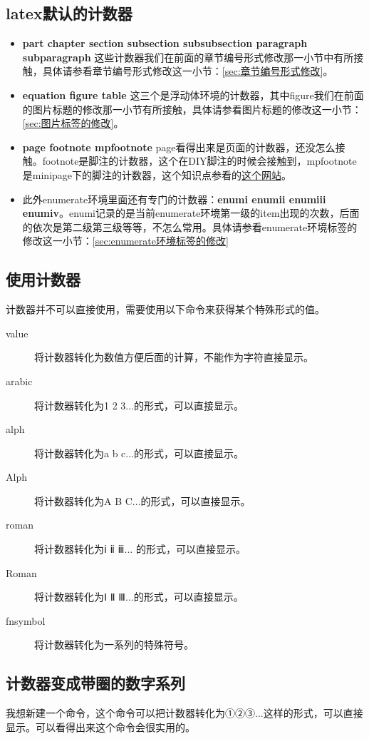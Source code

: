 \documentclass[12pt,oneside]{book}
\begin{document}
\begin{common-format}
\subsection{latex默认的计数器}
\begin{itemize}
\item \textbf{part chapter section subsection subsubsection paragraph subparagraph} 这些计数器我们在前面的章节编号形式修改那一小节中有所接触，具体请参看章节编号形式修改这一小节：\ref{sec:章节编号形式修改}。
\item \textbf{equation figure table} 这三个是浮动体环境的计数器，其中figure我们在前面的图片标题的修改那一小节有所接触，具体请参看图片标题的修改这一小节：\ref{sec:图片标签的修改}。
\item \textbf{page footnote mpfootnote} page看得出来是页面的计数器，还没怎么接触。footnote是脚注的计数器，这个在DIY脚注的时候会接触到，mpfootnote是minipage下的脚注的计数器，这个知识点参看的\href{http://tex.stackexchange.com/questions/18499/how-to-change-symbol-for-footnote-in-minipage}{这个网站}。
\item 此外enumerate环境里面还有专门的计数器：\textbf{enumi enumii enumiii enumiv}。enumi记录的是当前enumerate环境第一级的item出现的次数，后面的依次是第二级第三级等等，不怎么常用。具体请参看enumerate环境标签的修改这一小节：\ref{sec:enumerate环境标签的修改}
\end{itemize}



\subsection{使用计数器}
计数器并不可以直接使用，需要使用以下命令来获得某个特殊形式的值。
\begin{description}
\item[value] 将计数器转化为数值方便后面的计算，不能作为字符直接显示。
\item[arabic] 将计数器转化为1 2 3...的形式，可以直接显示。
\item[alph] 将计数器转化为a b c...的形式，可以直接显示。
\item[Alph] 将计数器转化为A B C...的形式，可以直接显示。
\item[roman] 将计数器转化为ⅰ ⅱ ⅲ... 的形式，可以直接显示。
\item[Roman] 将计数器转化为Ⅰ Ⅱ Ⅲ...的形式，可以直接显示。
\item[fnsymbol] 将计数器转化为一系列的特殊符号。
\end{description}

\subsection{计数器变成带圈的数字系列}
我想新建一个命令，这个命令可以把计数器转化为①②③...这样的形式，可以直接显示。可以看得出来这个命令会很实用的。


\end{common-format}
\end{document}
